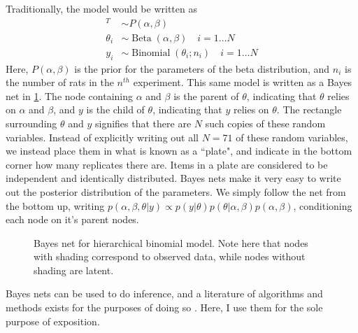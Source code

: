 Traditionally, the model would be written as 
%
\begin{align*}
	[\alpha,\beta]^T &\sim P(\alpha, \beta) \\
	\theta_i &\sim \operatorname{Beta}(\alpha,\beta) \quad i = 1 \dots N\\
	y_i &\sim \operatorname{Binomial}(\theta_i ; n_i) \quad i = 1 \dots N
	\end{align*}
%
Here, $ P(\alpha, \beta)  $ is the prior for the parameters of the beta distribution, and $ n_i $ is the number of rats in the $ n^{th} $ experiment.  This same model is written as a Bayes net in \cref{bayesnet}.   The node containing $ \alpha $ and $ \beta $ is the parent of $ \theta $, indicating that $ \theta $ relies on $ \alpha $ and $ \beta $, and $ y $ is the child of $ \theta $, indicating that $ y $ relies on $ \theta $.  The rectangle surrounding $ \theta $ and $ y $ signifies that there are $ N $ such copies of these random variables.  Instead of explicitly writing out all $ N=71 $ of these random variables, we instead place them in what is known as a ``plate", and indicate in the bottom corner how many replicates there are.  Items in a plate are considered to be independent and identically distributed.  Bayes nets make it very easy to write out the posterior distribution of the parameters.  We simply follow the net from the bottom up, writing $ p(\alpha,\beta, \theta \vert y) \propto p(y\vert \theta)p(\theta \vert \alpha, \beta)p(\alpha,\beta) $, conditioning each node on it's parent nodes.

\begin{figure}[h!]

	\centering
	\caption{Bayes net for hierarchical binomial model.  Note here that nodes with shading correspond to observed data, while nodes without shading are latent.}
	\label{bayesnet}
\end{figure}

Bayes nets can be used to do inference, and a literature of algorithms and methods exists for the purposes of doing so \cite{Bishop2006pattern,koller2009probabilistic}.  Here, I use them for the sole purpose of exposition.


